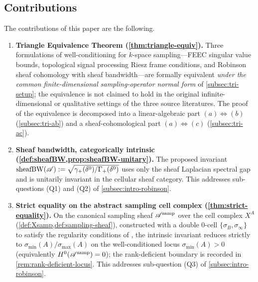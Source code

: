\subsection{Contributions}\label{subsec:intro-contributions}

The contributions of this paper are the following.

\begin{enumerate}[leftmargin=*,label=(C\arabic*)]
\item \textbf{Triangle Equivalence Theorem
    (\cref{thm:triangle-equiv}).} Three formulations of well-conditioning
  for $k$-space sampling---FEEC singular value bounds, topological
  signal processing Riesz frame conditions, and Robinson sheaf
  cohomology with sheaf bandwidth---are formally equivalent
  \emph{under the common finite-dimensional sampling-operator normal
  form} of \cref{subsec:tri-setup}; the equivalence is not claimed
  to hold in the original infinite-dimensional or qualitative
  settings of the three source literatures. The proof of the
  equivalence is decomposed into a linear-algebraic part
  $(a) \Leftrightarrow (b)$ (\cref{subsec:tri-ab}) and a
  sheaf-cohomological part $(a) \Leftrightarrow (c)$
  (\cref{subsec:tri-ac}).

\item \textbf{Sheaf bandwidth, categorically intrinsic
    (\cref{def:sheafBW,prop:sheafBW-unitary}).} The proposed invariant
  $\operatorname{sheafBW}(\mathscr{A}) := \sqrt{\gamma_+(\delta^0)/\Gamma_+(\delta^0)}$
  uses only the sheaf Laplacian spectral gap and is unitarily
  invariant in the cellular sheaf category. This addresses
  sub-questions (\textup{Q1}) and (\textup{Q2}) of
  \cref{subsec:intro-robinson}.

\item \textbf{Strict equality on the abstract sampling cell complex
    (\cref{thm:strict-equality}).} On the canonical sampling sheaf
  $\mathscr{A}^{\mathrm{samp}}$ over the cell complex $X^A$
  (\cref{def:Xsamp,def:sampling-sheaf}), constructed with a double
  $0$-cell $\{\sigma_B, \sigma_\infty\}$ to satisfy the regularity
  conditions of \cite[Def.~1, Cond.~4]{HansenGhrist2019}, the
  intrinsic invariant reduces strictly to
  $\sigma_{\min}(A)/\sigma_{\max}(A)$ on the well-conditioned locus
  $\sigma_{\min}(A) > 0$ (equivalently $H^0(\mathscr{A}^{\mathrm{samp}}) = 0$); the
  rank-deficient boundary is recorded in
  \cref{rem:rank-deficient-locus}. This addresses sub-question
  (\textup{Q3}) of \cref{subsec:intro-robinson}.


\end{enumerate}
